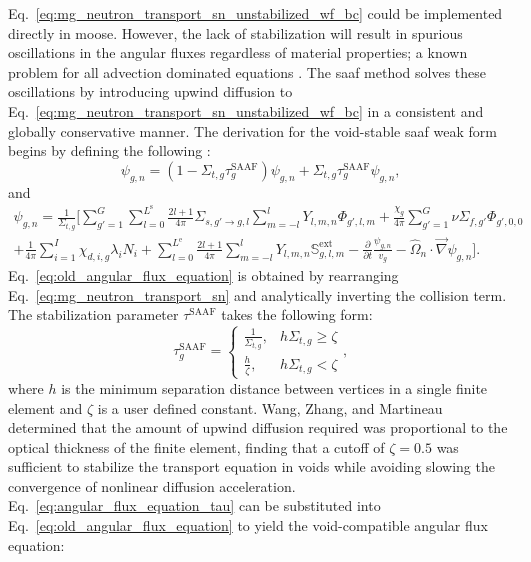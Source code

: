 Eq.~\ref{eq:mg_neutron_transport_sn_unstabilized_wf_bc} could be implemented directly in \acrshort{moose}. However, the lack of stabilization will result in spurious oscillations in the angular fluxes regardless of material properties; a known problem for all advection dominated equations \cite{ad_diff_supg}. The \acrshort{saaf} method solves these oscillations by introducing upwind diffusion to Eq.~\ref{eq:mg_neutron_transport_sn_unstabilized_wf_bc} in a consistent and globally conservative manner. The derivation for the void-stable \acrshort{saaf} weak form begins by defining the following \cite{cgfem_saaf_sn_2}:
\begin{equation}\label{eq:angular_flux_equation_tau}
    \psi_{g,n} = (1 - \Sigma_{t,g}\tau^{\text{SAAF}}_{g})\psi_{g,n} + \Sigma_{t,g}\tau^{\text{SAAF}}_{g}\psi_{g,n} \text{,}
\end{equation}
and 
\begin{multline}\label{eq:old_angular_flux_equation}
    \psi_{g,n} =\frac{1}{\Sigma_{t,g}}\Bigg[
    \sum_{g' = 1}^{G}\sum_{l = 0}^{L^{\text{s}}}\frac{2l + 1}{4\pi}\Sigma_{s, g'\rightarrow g, l}\sum_{m = -l}^{l} Y_{l,m,n}\Phi_{g', l, m}
    + \frac{\chi_{g}}{4\pi}\sum_{g' = 1}^{G} \nu\Sigma_{f,g'}\Phi_{g',0,0}\\
    + \frac{1}{4\pi}\sum_{i = 1}^{I} \chi_{d,i,g}\lambda_{i}N_{i} + \sum_{l = 0}^{L^{\text{e}}} \frac{2l + 1}{4\pi} \sum_{m = -l}^{l}Y_{l,m,n}\mathbb{S}^{\text{ext}}_{g,l,m}
    - \frac{\partial}{\partial t}\frac{\psi_{g,n}}{v_{g}} 
    - \hat{\Omega}_{n}\cdot\vec{\nabla}\psi_{g,n}
    \Bigg]\text{.}
\end{multline}
Eq.~\ref{eq:old_angular_flux_equation} is obtained by rearranging Eq.~\ref{eq:mg_neutron_transport_sn} and analytically inverting the collision term. The stabilization parameter $\tau^{\text{SAAF}}$ takes the following form:
\begin{equation}\label{eq:saaf_tau}
    \tau^{\text{SAAF}}_{g} = 
    \begin{cases}
        \frac{1}{\Sigma_{t,g}}, & h\Sigma_{t,g} \geq \zeta\\
        \frac{h}{\zeta}, & h\Sigma_{t,g} < \zeta
    \end{cases}\text{,}
\end{equation}
where $h$ is the minimum separation distance between vertices in a single finite element and $\zeta$ is a user defined constant. Wang, Zhang, and Martineau \cite{cgfem_saaf_sn_2} determined that the amount of upwind diffusion required was proportional to the optical thickness of the finite element, finding that a cutoff of $\zeta = 0.5$ was sufficient to stabilize the transport equation in voids while avoiding slowing the convergence of nonlinear diffusion acceleration. Eq.~\ref{eq:angular_flux_equation_tau} can be substituted into Eq.~\ref{eq:old_angular_flux_equation} to yield the void-compatible angular flux equation:
